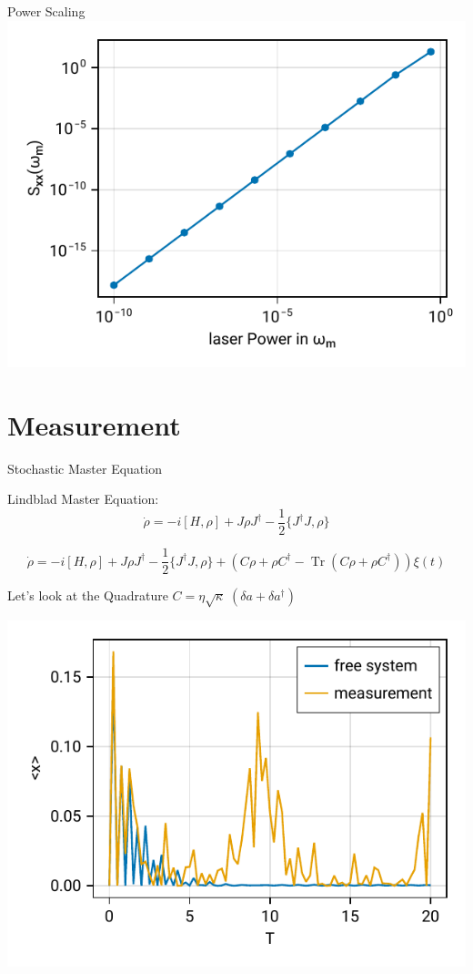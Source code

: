 \documentclass{beamer}
\DeclareMathOperator{\Tr}{Tr}
\begin{document}
\begin{frame}{Power Scaling}
	\centering
	\includegraphics{figures/03 power sweep.pdf}
\end{frame}

\section{Measurement}
\begin{frame}{Stochastic Master Equation}
	
	{
		\color{seegrau}
		Lindblad Master Equation:
		$$\dot\rho = -i[H,\rho] + J\rho J^\dagger - \frac{1}{2} \{J^\dagger J, \rho\}$$
	}

	$$
		\dot\rho 
		= -i[H,\rho] 
		+ J\rho J^\dagger - \frac{1}{2} \{J^\dagger J, \rho\} 
		+ \left(C\rho + \rho C^\dagger - \Tr(C\rho + \rho C^\dagger)\right)\xi(t)
	$$

	Let's look at the Quadrature $C = \eta\sqrt{\kappa}\;(\delta a + \delta a^\dagger)$

\end{frame}

\begin{frame}
	\centering
	\includegraphics{figures/04 time evolution.pdf}
\end{frame}
\end{document}
